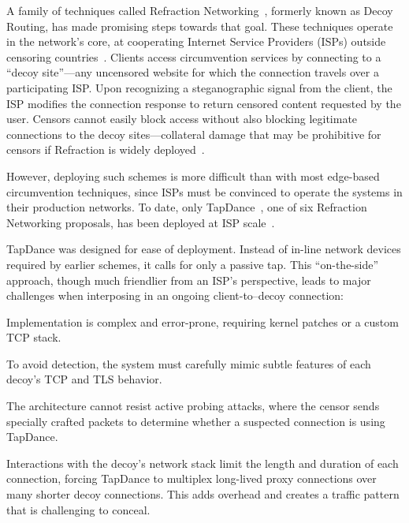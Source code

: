 \documentclass[sigconf]{acmart}
\begin{document}

A family of techniques called Refraction Networking~\cite{telex11,cirripede11,curveball11,tapdance14,rebound15,slitheen16,waterfall17}, formerly known
as Decoy Routing, has made promising steps towards that goal.
These techniques operate in the network's core, at cooperating Internet Service Providers
(ISPs) outside censoring countries~\cite{refraction-site}.  Clients access circumvention services by connecting to a ``decoy site''---any uncensored website for which the connection travels over a participating ISP\@.  Upon recognizing a steganographic signal from the client, the ISP modifies the connection response to return censored content requested by the user.
Censors cannot easily block access without also blocking legitimate connections to the decoy sites---collateral damage that may be prohibitive for censors if Refraction is widely deployed~\cite{robinson2013collateral}.

However, deploying such schemes is more difficult than with most
edge-based circumvention techniques, since ISPs must be convinced to
operate the systems in their production networks.  To date, only
TapDance~\cite{tapdance14}, one of six Refraction Networking
proposals, has been deployed at ISP scale~\cite{frolov2017isp}.

TapDance was designed for ease of deployment.
Instead of in-line network devices required by earlier schemes, it
calls for only a passive tap.
This ``on-the-side'' approach, though much friendlier from an ISP's
perspective, leads to major challenges when interposing in an ongoing
client-to--decoy connection:
\begin{compactitem}
\item Implementation is complex and error-prone, requiring kernel
  patches or a custom TCP stack.
\item To avoid detection, the system must carefully mimic
  subtle features of each decoy's TCP and TLS behavior.
\item The architecture cannot resist active probing attacks, where the
  censor sends specially crafted packets to determine whether a
  suspected connection is using TapDance.
\item Interactions with the decoy's network stack limit the length and
  duration of each connection, forcing TapDance to multiplex
  long-lived proxy connections over many shorter decoy
  connections. This adds overhead and creates a traffic pattern
  that is challenging to conceal.
\end{compactitem}
\end{document}
